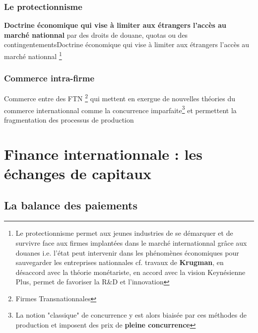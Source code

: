 \subsubsection{Le protectionnisme}
\textbf{Doctrine économique qui vise à limiter aux étrangers l'accès au marché nationnal} par des droits de douane, quotas ou des contingentementsDoctrine économique qui vise à limiter aux étrangers l'accès au marché nationnal \newline
\footnote{Le protectionnisme permet aux jeunes industries de se démarquer et de survivre face aux firmes implantées dans le marché internationnal grâce aux douanes \newline i.e. l'état peut intervenir dans les phénomènes économiques pour sauvegarder les entreprises nationnales cf. travaux de \textbf{Krugman}, en désaccord avec la théorie \textcolor{BrickRed}{monétariste}, en accord avec la vision \textcolor{BrickRed}{Keynésienne} \newline Plus, permet de favoriser la R\&D et l'innovation}
\subsubsection{Commerce intra-firme}
Commerce entre des FTN \footnote{Firmes Transnationnales} qui mettent en exergue de nouvelles théories du commerce internationnal comme la \textcolor{BrickRed}{concurrence imparfaite}\footnote{La notion "classique" de concurrence y est alors biaisée par ces méthodes de production et imposent des prix de \textbf{pleine concurrence}} et permettent la fragmentation des processus de production
\section{Finance internationnale : les échanges de capitaux}
\subsection{La balance des paiements}
